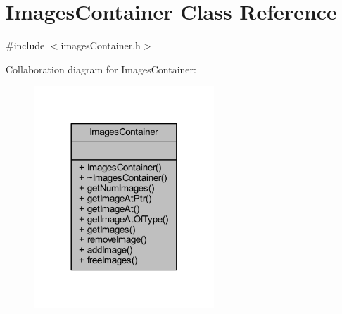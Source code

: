 \hypertarget{class_images_container}{}\section{Images\+Container Class Reference}
\label{class_images_container}


{\ttfamily \#include $<$images\+Container.\+h$>$}



Collaboration diagram for Images\+Container\+:
\nopagebreak
\begin{figure}[H]
\begin{center}
\leavevmode
\includegraphics[width=192pt]{class_images_container__coll__graph}
\end{center}
\end{figure}
